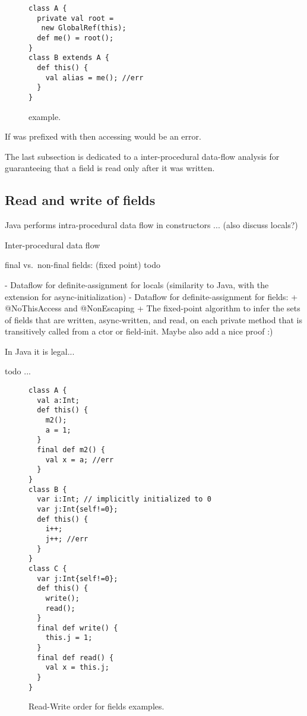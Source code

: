 \begin{figure}
\begin{lstlisting}
class A {
  private val root =
   new GlobalRef(this);
  def me() = root();
}
class B extends A {
  def this() {
    val alias = me(); //err
  }
}
\end{lstlisting}
\caption{ example.
    }
\label{Figure:GlobalRef}
\end{figure}

If  was prefixed with
then accessing  would be an error.



The last subsection is dedicated to a inter-procedural data-flow analysis for guaranteeing
    that a field is read only after it was written.

\subsection{Read and write of fields}
Java performs intra-procedural data flow in constructors ...
(also discuss locals?)

Inter-procedural data flow

final vs.\ non-final fields:
(fixed point)
todo

- Dataflow for definite-assignment for locals (similarity to Java, with the extension for async-initialization)
- Dataflow for definite-assignment for fields:
  + @NoThisAccess and @NonEscaping
  + The fixed-point algorithm to infer the sets of fields that are written, async-written, and read, on each private method that is transitively called from a ctor or field-init. Maybe also add a nice proof :)


In Java it is legal...

 todo ...

\begin{figure}
\begin{lstlisting}
class A {
  val a:Int;
  def this() {
    m2();
    a = 1;
  }
  final def m2() {
    val x = a; //err
  }
}
class B {
  var i:Int; // implicitly initialized to 0
  var j:Int{self!=0};
  def this() {
    i++;
    j++; //err
  }
}
class C {
  var j:Int{self!=0};
  def this() {
    write();
    read();
  }
  final def write() {
    this.j = 1;
  }
  final def read() {
    val x = this.j;
  }
}
\end{lstlisting}
\caption{Read-Write order for fields examples.
    }
\label{Figure:Read-Write-Order}
\end{figure}



